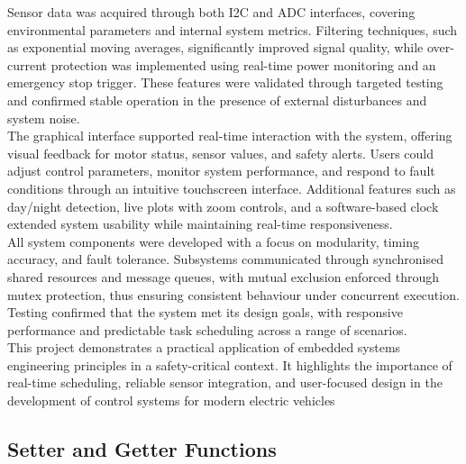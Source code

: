 \documentclass[a4paper, 11pt, titlepage]{article}
\begin{document}
Sensor data was acquired through both I2C and ADC interfaces, covering environmental parameters and internal system metrics. Filtering techniques, such as exponential moving averages, significantly improved signal quality, while over-current protection was implemented using real-time power monitoring and an emergency stop trigger. These features were validated through targeted testing and confirmed stable operation in the presence of external disturbances and system noise.\\

The graphical interface supported real-time interaction with the system, offering visual feedback for motor status, sensor values, and safety alerts. Users could adjust control parameters, monitor system performance, and respond to fault conditions through an intuitive touchscreen interface. Additional features such as day/night detection, live plots with zoom controls, and a software-based clock extended system usability while maintaining real-time responsiveness.\\

All system components were developed with a focus on modularity, timing accuracy, and fault tolerance. Subsystems communicated through synchronised shared resources and message queues, with mutual exclusion enforced through mutex protection, thus ensuring consistent behaviour under concurrent execution. Testing confirmed that the system met its design goals, with responsive performance and predictable task scheduling across a range of scenarios.\\

This project demonstrates a practical application of embedded systems engineering principles in a safety-critical context. It highlights the importance of real-time scheduling, reliable sensor integration, and user-focused design in the development of control systems for modern electric vehicles

\newpage
\clearpage
{}
\printbibliography

\onecolumn
\begin{appendices}
\section{Setter and Getter Functions}
\begin{figure}[h!]
\centering

\end{figure}

\end{appendices}
\end{document}
